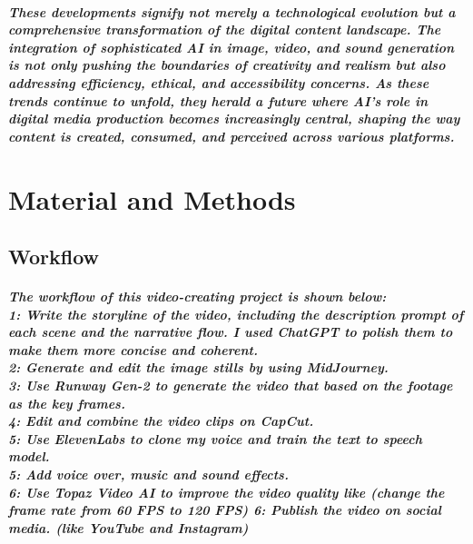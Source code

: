\documentclass[11pt,a4paper,oneside]{report}
\begin{document}
\paragraph{These developments signify not merely a technological evolution but a comprehensive transformation of the digital content landscape. The integration of sophisticated AI in image, video, and sound generation is not only pushing the boundaries of creativity and realism but also addressing efficiency, ethical, and accessibility concerns. As these trends continue to unfold, they herald a future where AI's role in digital media production becomes increasingly central, shaping the way content is created, consumed, and perceived across various platforms.}





\chapter{Material and Methods}
\label{material-and-methods}

\section{Workflow}
\paragraph{The workflow of this video-creating project is shown below: \\
1: Write the storyline of the video, including the description prompt of each scene and the narrative flow. I used ChatGPT to polish them to make them more concise and coherent.\\
2: Generate and edit the image stills by using MidJourney. \\
3: Use Runway Gen-2 to generate the video that based on the footage as the key frames.\\
4: Edit and combine the video clips on CapCut. \\
5: Use ElevenLabs to clone my voice and train the text to speech model.\\
5: Add voice over, music and sound effects. \\
6: Use Topaz Video AI to improve the video quality like (change the frame rate from 60 FPS to 120 FPS)
6: Publish the video on social media. (like YouTube and Instagram)\\}
\end{document}
